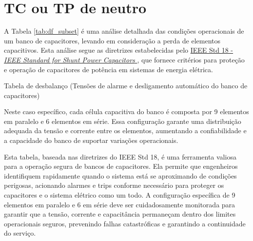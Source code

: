 \documentclass[a4paper]{article}
\begin{document}
\section{TC ou TP de neutro}
A Tabela \ref{tab:df_subset} é uma análise detalhada das condições operacionais de um banco de capacitores, levando em consideração a perda de elementos capacitivos. Esta análise segue as diretrizes estabelecidas pelo \href{https://ieeexplore.ieee.org/document/6466331}{IEEE Std 18 - \textit{IEEE Standard for Shunt Power Capacitors} \cite{ieee18}}, que fornece critérios para proteção e operação de capacitores de potência em sistemas de energia elétrica.

\begin{table}[htbp]
	\centering
	\caption[]{Tabela de desbalanço (Tensões de alarme e desligamento automático do banco de capacitores)}
	
	\label{tab:df_subset}
\end{table}




Neste caso específico, cada célula capacitiva do banco é composta por 9 elementos em paralelo e 6 elementos em série. Essa configuração garante uma distribuição adequada da tensão e corrente entre os elementos, aumentando a confiabilidade e a capacidade do banco de suportar variações operacionais.

Esta tabela, baseada nas diretrizes do IEEE Std 18, é uma ferramenta valiosa para a operação segura de bancos de capacitores. Ela permite que engenheiros identifiquem rapidamente quando o sistema está se aproximando de condições perigosas, acionando alarmes e trips conforme necessário para proteger os capacitores e o sistema elétrico como um todo. A configuração específica de 9 elementos em paralelo e 6 em série deve ser cuidadosamente monitorada para garantir que a tensão, corrente e capacitância permaneçam dentro dos limites operacionais seguros, prevenindo falhas catastróficas e garantindo a continuidade do serviço.

\printbibliography
\end{document}
